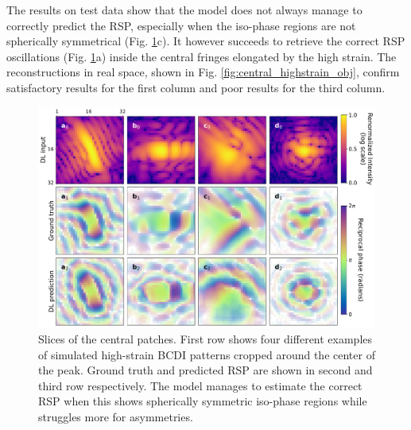 The results on test data show that the model does not always manage to correctly predict the RSP, especially when the 
iso-phase regions are not spherically symmetrical (Fig. \ref{fig:central_highstrain_RSP}c). It however succeeds to 
retrieve the correct RSP oscillations (Fig. \ref{fig:central_highstrain_RSP}a) inside the central fringes elongated by the
high strain. The reconstructions in real space, shown in Fig. \ref{fig:central_highstrain_obj}, confirm satisfactory 
results for the first column and poor results for the third column. 

\begin{figure}[H]
    \centering
    \includegraphics[width=\textwidth]{figures/Phasing/central_patch_highstrain_RSP.pdf}
    \caption{Slices of the central patches. First row shows four different examples of simulated high-strain BCDI patterns cropped around the 
    center of the peak. Ground truth and predicted RSP are shown in second and third row respectively. The model manages 
    to estimate the correct RSP when this shows spherically symmetric iso-phase regions while struggles more for asymmetries. }
    \label{fig:central_highstrain_RSP}
\end{figure}

